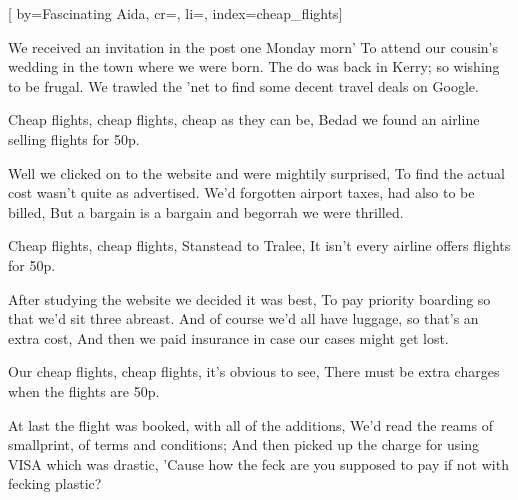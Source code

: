 

[%
    by={Fascinating Aida},
    cr={},
    li={},
    index={cheap_flights}]


    \label{cheap_flights}


    \beginverse\memorize[verse]
        We received an invitation in the post one Monday morn'
        To attend our cousin's wedding in the town where we were born.
        The do was back in Kerry; so wishing to be frugal.
        We trawled the 'net to find some decent travel deals on Google.
    \endverse

    \beginchorus\memorize[chorus]
        Cheap flights, cheap flights, cheap as they can be,
        Bedad we found an airline selling flights for 50p.
    \endchorus

    \beginverse\replay[verse]
        Well we clicked on to the website and were mightily surprised,
        To find the actual cost wasn't quite as advertised.
        We'd forgotten airport taxes, had also to be billed,
        But a bargain is a bargain and begorrah we were thrilled.
    \endverse

    \beginchorus\replay[chorus]
        Cheap flights, cheap flights, Stanstead to Tralee,
        It isn't every airline offers flights for 50p.
    \endchorus

    \beginverse\replay[verse]
        After studying the website we decided it was best,
        To pay priority boarding so that we'd sit three abreast.
        And of course we'd all have luggage, so that's an extra cost,
        And then we paid insurance in case our cases might get lost.
    \endverse

    \beginchorus\replay[chorus]
        Our cheap flights, cheap flights, it's obvious to see,
        There must be extra charges when the flights are 50p.
    \endchorus

    \beginverse\replay[verse]
        At last the flight was booked, with all of the additions,
        We'd read the reams of smallprint, of terms and conditions;
        And then picked up the charge for using VISA which was drastic,
        'Cause how the feck are you supposed to pay if not with fecking plastic?
    \endverse

